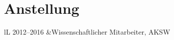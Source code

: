 \documentclass[a4paper,11pt]{article}
\begin{document}
\section*{Anstellung}
\begin{tabulary}{\textwidth}{lL}
2012--2016		&Wissenschaftlicher Mitarbeiter, AKSW\\

\end{tabulary}
\end{document}
